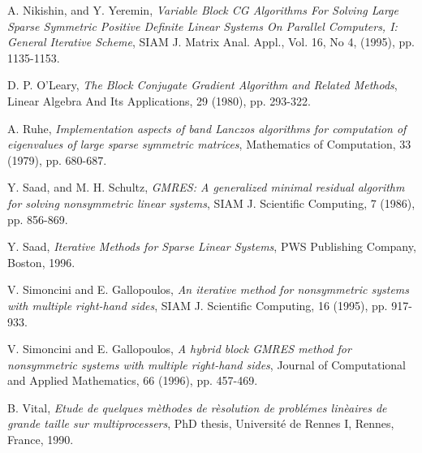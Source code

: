 \documentclass{article}
\begin{document}
\begin{thebibliography}{AAAA99}
 A. Nikishin, and Y. Yeremin, {\em Variable
Block CG Algorithms For Solving Large Sparse Symmetric Positive
Definite Linear Systems On Parallel Computers, I: General
Iterative Scheme}, SIAM J. Matrix Anal. Appl., Vol. 16, No 4,
(1995), pp. 1135-1153.

 D. P. O'Leary, {\em The Block Conjugate Gradient
Algorithm and Related Methods}, Linear Algebra And Its
Applications, 29 (1980), pp. 293-322.

 A. Ruhe, {\em Implementation aspects of band
Lanczos algorithms for computation of eigenvalues of large sparse
symmetric matrices}, Mathematics of Computation, 33 (1979), pp.
680-687.

 Y. Saad, and M. H. Schultz, {\em GMRES: A
generalized minimal residual algorithm for solving nonsymmetric
linear systems}, SIAM J. Scientific Computing, 7 (1986), pp.
856-869.

 Y. Saad, {\em Iterative Methods for Sparse
Linear Systems}, PWS Publishing Company, Boston, 1996.

 V. Simoncini and E. Gallopoulos, {\em An
iterative method for nonsymmetric systems with multiple right-hand
sides}, SIAM J. Scientific Computing, 16 (1995), pp. 917-933.

 V. Simoncini and E. Gallopoulos, {\em A
hybrid block GMRES method for nonsymmetric systems with multiple
right-hand sides}, Journal of Computational and Applied
Mathematics, 66 (1996), pp. 457-469.

 B. Vital, {\em Etude de quelques m\`{e}thodes de
r\`{e}solution de probl\'{e}mes lin\`{e}aires de grande taille sur
multiprocessers}, PhD thesis, Universit\'{e} de Rennes I, Rennes,
France, 1990.


\end{thebibliography}
\end{document}
